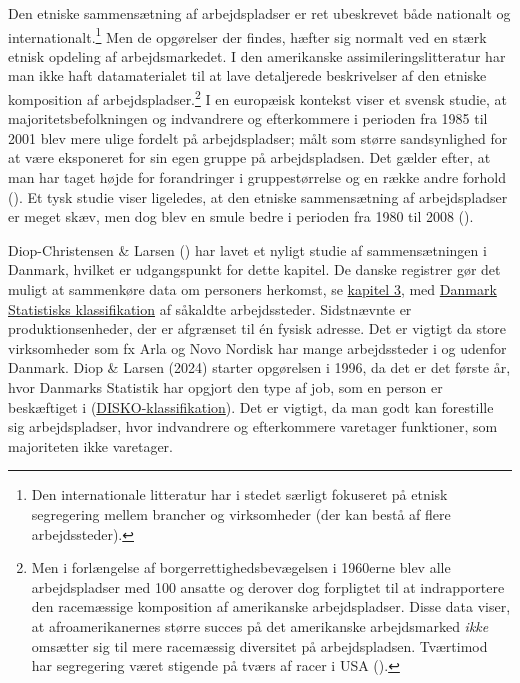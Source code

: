 \documentclass[
]{book}
\begin{document}
Den etniske sammensætning af arbejdspladser er ret ubeskrevet både nationalt og internationalt.\footnote{Den internationale litteratur har i stedet særligt fokuseret på etnisk segregering mellem brancher og virksomheder (der kan bestå af flere arbejdssteder).} Men de opgørelser der findes, hæfter sig normalt ved en stærk etnisk opdeling af arbejdsmarkedet. I den amerikanske assimileringslitteratur har man ikke haft datamaterialet til at lave detaljerede beskrivelser af den etniske komposition af arbejdspladser.\footnote{Men i forlængelse af borgerrettighedsbevægelsen i 1960erne blev alle arbejdspladser med 100 ansatte og derover dog forpligtet til at indrapportere den racemæssige komposition af amerikanske arbejdspladser. Disse data viser, at afroamerikanernes større succes på det amerikanske arbejdsmarked \emph{ikke} omsætter sig til mere racemæssig diversitet på arbejdspladsen. Tværtimod har segregering været stigende på tværs af racer i USA ().} I en europæisk kontekst viser et svensk studie, at majoritetsbefolkningen og indvandrere og efterkommere i perioden fra 1985 til 2001 blev mere ulige fordelt på arbejdspladser; målt som større sandsynlighed for at være eksponeret for sin egen gruppe på arbejdspladsen. Det gælder efter, at man har taget højde for forandringer i gruppestørrelse og en række andre forhold (). Et tysk studie viser ligeledes, at den etniske sammensætning af arbejdspladser er meget skæv, men dog blev en smule bedre i perioden fra 1980 til 2008 ().

Diop-Christensen \& Larsen () har lavet et nyligt studie af sammensætningen i Danmark, hvilket er udgangspunkt for dette kapitel. De danske registrer gør det muligt at sammenkøre data om personers herkomst, se \hyperref[kap2]{kapitel 3}, med \href{https://www.dst.dk/Site/Dst/SingleFiles/GetArchiveFile.aspx?fi=659482655935&fo=0&ext=kvaldel}{Danmark Statistisks klassifikation} af såkaldte arbejdssteder. Sidstnævnte er produktionsenheder, der er afgrænset til én fysisk adresse. Det er vigtigt da store virksomheder som fx Arla og Novo Nordisk har mange arbejdssteder i og udenfor Danmark. Diop \& Larsen (2024) starter opgørelsen i 1996, da det er det første år, hvor Danmarks Statistik har opgjort den type af job, som en person er beskæftiget i (\href{https://www.dst.dk/Site/Dst/SingleFiles/GetArchiveFile.aspx?fi=2299282738&fo=0&ext=kvaldel}{DISKO-klassifikation}). Det er vigtigt, da man godt kan forestille sig arbejdspladser, hvor indvandrere og efterkommere varetager funktioner, som majoriteten ikke varetager.
\end{document}

